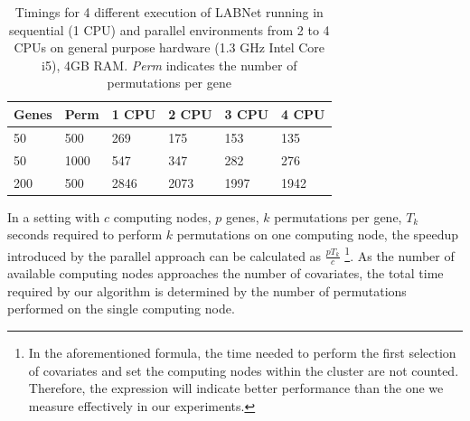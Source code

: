  
\begin{table}[h]
\begin{tabular}{|l|l|l|l|l|l|}
\hline
\textbf{Genes} & \textbf{Perm} & \textbf{1 CPU} & \textbf{2 CPU} & \textbf{3 CPU} & \textbf{4 CPU} \\ \hline
               50 & 500      &   269   &      175  &  153   &  135  \\ \hline
               50 & 1000    &   547  &  347        &  282   &   276  \\ \hline
               200 &  500   &   2846   &   2073  &  1997  & 1942      \\ \hline
\end{tabular}
\vspace{5mm}
\caption{Timings for 4 different execution of LABNet running in sequential (1 CPU) and parallel environments from 2 to 4 CPUs on general purpose hardware (1.3 GHz Intel Core i5), 4GB RAM. \emph{Perm} indicates the number of permutations per gene }
\label{timings}
\end{table}

In a setting with $c$ computing nodes, $p$ genes, $k$ permutations per gene, $T_k$ seconds required to perform $k$ permutations on one computing node, the speedup introduced by the parallel approach can be calculated as 
$\frac{p T_k}{c}$ \footnote{In the aforementioned formula, the time needed to perform the first selection of covariates and set the computing nodes within the cluster are not counted. Therefore, the expression will indicate better performance than the one we measure effectively in our experiments.}. As the number of available computing nodes approaches the number of covariates, the total time required by our algorithm is determined by the number of permutations performed on the single computing node. 
